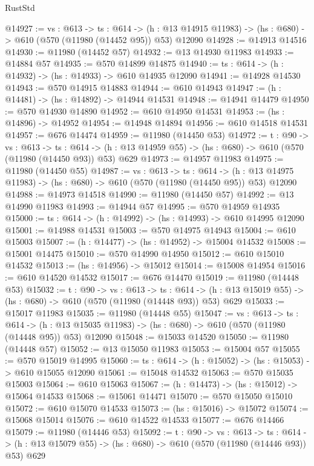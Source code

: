 \begin{lexlean}{RustStd}
\begin{coremodule}
@14927 := {vs : @613} ->
  {ts : @614} ->
  (h : @13 @14915 @11983) -> (hs : @680) -> @610 (@570 (@11980 (@14452 @95)) @53) @12090
@14928 := @14913 @14516
@14930 := @11980 (@14452 @57)
@14932 := @13 @14930 @11983
@14933 := @14884 @57
@14935 := @570 @14899 @14875
@14940 := {ts : @614} -> (h : @14932) -> (hs : @14933) -> @610 @14935 @12090
@14941 := @14928 @14530
@14943 := @570 @14915 @14883
@14944 := @610 @14943
@14947 := (h : @14481) -> (hs : @14892) -> @14944 @14531
@14948 := @14941 @14479
@14950 := @570 @14930 @14890
@14952 := @610 @14950 @14531
@14953 := (hs : @14896) -> @14952
@14954 := @14948 @14894
@14956 := @610 @14518 @14531
@14957 := @676 @14474
@14959 := @11980 (@14450 @53)
@14972 := {t : @90} ->
  {vs : @613} ->
  {ts : @614} -> (h : @13 @14959 @55) -> (hs : @680) -> @610 (@570 (@11980 (@14450 @93)) @53) @629
@14973 := @14957 @11983
@14975 := @11980 (@14450 @55)
@14987 := {vs : @613} ->
  {ts : @614} ->
  (h : @13 @14975 @11983) -> (hs : @680) -> @610 (@570 (@11980 (@14450 @95)) @53) @12090
@14988 := @14973 @14518
@14990 := @11980 (@14450 @57)
@14992 := @13 @14990 @11983
@14993 := @14944 @57
@14995 := @570 @14959 @14935
@15000 := {ts : @614} -> (h : @14992) -> (hs : @14993) -> @610 @14995 @12090
@15001 := @14988 @14531
@15003 := @570 @14975 @14943
@15004 := @610 @15003
@15007 := (h : @14477) -> (hs : @14952) -> @15004 @14532
@15008 := @15001 @14475
@15010 := @570 @14990 @14950
@15012 := @610 @15010 @14532
@15013 := (hs : @14956) -> @15012
@15014 := @15008 @14954
@15016 := @610 @14520 @14532
@15017 := @676 @14470
@15019 := @11980 (@14448 @53)
@15032 := {t : @90} ->
  {vs : @613} ->
  {ts : @614} -> (h : @13 @15019 @55) -> (hs : @680) -> @610 (@570 (@11980 (@14448 @93)) @53) @629
@15033 := @15017 @11983
@15035 := @11980 (@14448 @55)
@15047 := {vs : @613} ->
  {ts : @614} ->
  (h : @13 @15035 @11983) -> (hs : @680) -> @610 (@570 (@11980 (@14448 @95)) @53) @12090
@15048 := @15033 @14520
@15050 := @11980 (@14448 @57)
@15052 := @13 @15050 @11983
@15053 := @15004 @57
@15055 := @570 @15019 @14995
@15060 := {ts : @614} -> (h : @15052) -> (hs : @15053) -> @610 @15055 @12090
@15061 := @15048 @14532
@15063 := @570 @15035 @15003
@15064 := @610 @15063
@15067 := (h : @14473) -> (hs : @15012) -> @15064 @14533
@15068 := @15061 @14471
@15070 := @570 @15050 @15010
@15072 := @610 @15070 @14533
@15073 := (hs : @15016) -> @15072
@15074 := @15068 @15014
@15076 := @610 @14522 @14533
@15077 := @676 @14466
@15079 := @11980 (@14446 @53)
@15092 := {t : @90} ->
  {vs : @613} ->
  {ts : @614} -> (h : @13 @15079 @55) -> (hs : @680) -> @610 (@570 (@11980 (@14446 @93)) @53) @629

\end{coremodule}
\end{lexlean}
